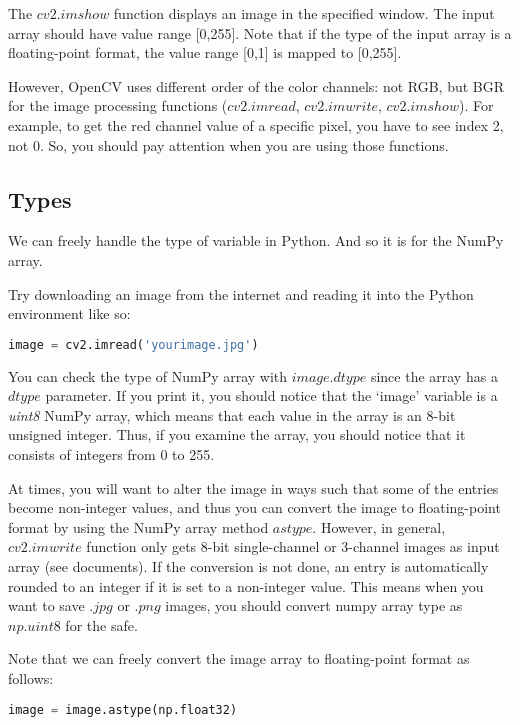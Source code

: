 \documentclass[11pt]{article}
\begin{document}
The \href{https://docs.opencv.org/4.5.0/d7/dfc/group__highgui.html#ga453d42fe4cb60e5723281a89973ee563}{$cv2.imshow$} function displays an image in the specified window. The input array should have value range [0,255]. Note that if the type of the input array is a floating-point format, the value range [0,1] is mapped to [0,255].

However, OpenCV uses different order of the color channels: not RGB, but BGR for the image processing functions ({$cv2.imread$}, {$cv2.imwrite$}, {$cv2.imshow$}). For example, to get the red channel value of a specific pixel, you have to see index 2, not 0. So, you should pay attention when you are using those functions.

\subsection{Types}
We can freely handle the type of variable in Python. And so it is for the NumPy array.

Try downloading an image from the internet and reading it into the Python environment like so:
\begin{lstlisting}[language=python]
image = cv2.imread('yourimage.jpg')
\end{lstlisting}

You can check the type of NumPy array with {$image.dtype$} since the array has a {$dtype$} parameter. If you print it, you should notice that the `image' variable is a \emph{uint8} NumPy array, which means that each value in the array is an 8-bit unsigned integer. Thus, if you examine the array, you should notice that it consists of integers from 0 to 255.

At times, you will want to alter the image in ways such that some of the entries become non-integer values, and thus you can convert the image to floating-point format by using the NumPy array method \href{https://numpy.org/doc/stable/reference/generated/numpy.ndarray.astype.html}{$astype$}. However, in general, {$cv2.imwrite$} function only gets 8-bit single-channel or 3-channel images as input array (see documents). If the conversion is not done, an entry is automatically rounded to an integer if it is set to a non-integer value. This means when you want to save {$.jpg$} or {$.png$} images, you should convert numpy array type as {$np.uint8$} for the safe.


Note that we can freely convert the image array to floating-point format as follows:
\begin{lstlisting}[language=python]
image = image.astype(np.float32)
\end{lstlisting}
\end{document}
